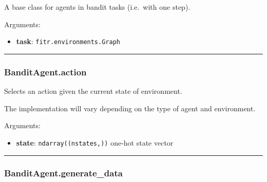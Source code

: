 \begin{Shaded}
\begin{Highlighting}[]
\end{Highlighting}
\end{Shaded}

A base class for agents in bandit tasks (i.e.~with one step).

Arguments:

\begin{itemize}
\tightlist
\item
  \textbf{task}: \texttt{fitr.environments.Graph}
\end{itemize}

\begin{center}\rule{0.5\linewidth}{\linethickness}\end{center}

\hypertarget{banditagent.action}{%
\subsubsection{BanditAgent.action}\label{banditagent.action}}

\begin{Shaded}
\begin{Highlighting}[]
\end{Highlighting}
\end{Shaded}

Selects an action given the current state of environment.

The implementation will vary depending on the type of agent and
environment.

Arguments:

\begin{itemize}
\tightlist
\item
  \textbf{state}: \texttt{ndarray((nstates,))} one-hot state vector
\end{itemize}

\begin{center}\rule{0.5\linewidth}{\linethickness}\end{center}

\hypertarget{banditagent.generate_data}{%
\subsubsection{BanditAgent.generate\_data}\label{banditagent.generate_data}}

